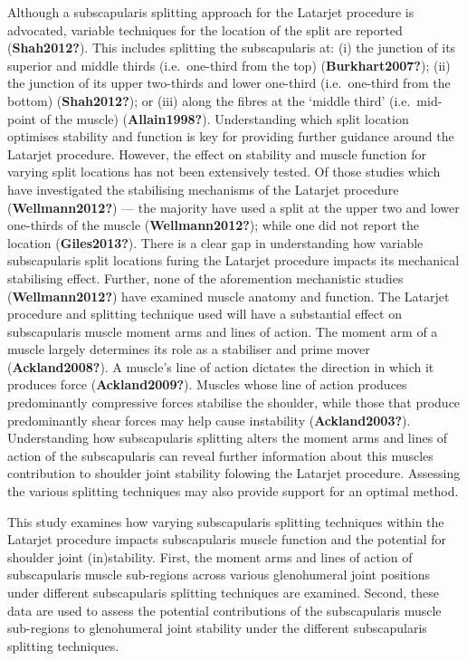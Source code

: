 \documentclass[]{elsarticle} %
\begin{document}
Although a subscapularis splitting approach for the Latarjet procedure
is advocated, variable techniques for the location of the split are
reported (\textbf{Shah2012?}). This includes splitting the subscapularis
at: (i) the junction of its superior and middle thirds (i.e.~one-third
from the top) (\textbf{Burkhart2007?}); (ii) the junction of its upper
two-thirds and lower one-third (i.e.~one-third from the bottom)
(\textbf{Shah2012?}); or (iii) along the fibres at the `middle third'
(i.e.~mid-point of the muscle) (\textbf{Allain1998?}). Understanding
which split location optimises stability and function is key for
providing further guidance around the Latarjet procedure. However, the
effect on stability and muscle function for varying split locations has
not been extensively tested. Of those studies which have investigated
the stabilising mechanisms of the Latarjet procedure
(\textbf{Wellmann2012?}) --- the majority have used a split at the upper
two and lower one-thirds of the muscle (\textbf{Wellmann2012?}); while
one did not report the location (\textbf{Giles2013?}). There is a clear
gap in understanding how variable subscapularis split locations furing
the Latarjet procedure impacts its mechanical stabilising effect.
Further, none of the aforemention mechanistic studies
(\textbf{Wellmann2012?}) have examined muscle anatomy and function. The
Latarjet procedure and splitting technique used will have a substantial
effect on subscapularis muscle moment arms and lines of action. The
moment arm of a muscle largely determines its role as a stabiliser and
prime mover (\textbf{Ackland2008?}). A muscle's line of action dictates
the direction in which it produces force (\textbf{Ackland2009?}).
Muscles whose line of action produces predominantly compressive forces
stabilise the shoulder, while those that produce predominantly shear
forces may help cause instability (\textbf{Ackland2003?}). Understanding
how subscapularis splitting alters the moment arms and lines of action
of the subscapularis can reveal further information about this muscles
contribution to shoulder joint stability folowing the Latarjet
procedure. Assessing the various splitting techniques may also provide
support for an optimal method.

This study examines how varying subscapularis splitting techniques
within the Latarjet procedure impacts subscapularis muscle function and
the potential for shoulder joint (in)stability. First, the moment arms
and lines of action of subscapularis muscle sub-regions across various
glenohumeral joint positions under different subscapularis splitting
techniques are examined. Second, these data are used to assess the
potential contributions of the subscapularis muscle sub-regions to
glenohumeral joint stability under the different subscapularis splitting
techniques.
\end{document}
